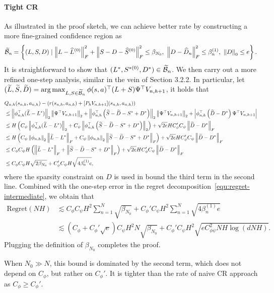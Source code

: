 \paragraph{Tight CR}
As illustrated in the proof sketch, we can achieve better rate by constructing a more fine-grained confidence region as 
\begin{align*}
\widetilde{{\cal B}}_n=\left\{(L,S,D) \mid \left\lVert L-\widehat L^{(0)}\right\rVert_F^2+\left\lVert S-D-\widehat S^{(0)}\right\rVert_F^2\le \beta_{N_0},\ \left\lVert D-\widehat D_n\right\rVert_F^2\le \beta_n^{(1)},\ \left\lVert D\right\rVert_0\le e\right\}.
\end{align*}
It is straightforward to show that $(L^*,S^{*(0)},D^*)\in \widetilde{{\cal B}}_n$.
We then carry out a more refined one-step analysis, similar in the vein of Section 3.2.2.
In particular, let $(\widetilde{ L},\widetilde{ S},\widetilde{D})=\arg\max_{\substack{ L, S \in \widetilde{{\cal B}}_n}}\phi(s, a)^{\top} ( L+ S)  \Psi^{\top} V_{n, h+1}$, it holds that
\begin{equation}
     \begin{aligned}
     &Q_{n,h}(s_{n,h},a_{n,h})-\left( r(s_{n,h},a_{n,h})+[P_h V_{n,h+1}](s_{n,h},a_{n,h}) \right) \\
     &\leq \left\lVert\phi_{n, h}^{\top}(\widetilde{ L} -  L^{*})\right\rVert_2\left\lVert \Psi^{\top} V_{n, h+1}\right\rVert_{2}+\left\lVert\phi_{n, h}^{\top}\left( \widetilde{ S}-\widetilde{D}-  S^*+D^* \right)\right\rVert_2\left\lVert \Psi^{\top} V_{n, h+1}\right\rVert_{2} +\left|\phi_{n, h}^{\top}\left( \widetilde{D}- D^* \right) \Psi^{\top} V_{n, h+1}\right| \\
     & \leq H\left( C_{\psi}\left\lVert\phi_{n, h}^{\top}(\widetilde{ L} -  L^*)\right\rVert_2+C_{\psi}\left\lVert\phi_{n, h}^{\top}\left( \widetilde{ S}-\widetilde{D}-  S^*+D^* \right)\right\rVert_2 \right)+\sqrt{2e}HC_{\phi}'C_{\psi}\left\lVert\widetilde{D}-D^*\right\rVert_F \\
     & \leq H\left( C_{\psi}\left\lVert\phi_{n, h}\right\rVert_2\left\lVert\widetilde{ L} -  L^{*}\right\rVert_F + C_{\psi}\left\lVert\phi_{n, h}\right\rVert_2\left\lVert\widetilde{ S}-\widetilde{D}-  S^*+D^*\right\rVert_F \right)+\sqrt{2e}HC_{\phi}'C_{\psi}\left\lVert\widetilde{D}-D^*\right\rVert_F \\
     & \leq C_{\phi}C_{\psi}H\left( \left\lVert\widetilde{ L}-  L^*\right\rVert_F + \left\lVert\widetilde{ S}-\widetilde{D}-  S^*+D^*\right\rVert_F \right)+\sqrt{2e}HC_{\phi}'C_{\psi}\left\lVert\widetilde{D}-D^*\right\rVert_F \\
     & \leq C_{\phi}C_{\psi}H\sqrt{2\beta_{N_0}}+C_{\phi}'C_{\psi}H\sqrt{4\beta_n^{(1)}e},
     \end{aligned}
    \end{equation}
where the sparsity constraint on $D$ is used in bound the third term in the second line.
Combined with the one-step error in the regret decomposition~\eqref{equ:regret-intermediate}, we obtain that
\begin{align*}
\text{Regret}
( N  H) &\lesssim C_{\phi}C_{\psi}H^2\sum_{n=1}^{ N }\sqrt{\beta_{N_0}}+C_{\phi}'C_{\psi}H^2\sum_{n=1}^{ N }\sqrt{4\beta_n^{(1)}e}\\&\lesssim 
\left(C_{\phi}+C_{\phi}'\sqrt{e}\right)C_{\psi}H^2 N \sqrt{\beta_{N_0}}+C_{\phi}'C_{\psi}H^2\sqrt{e C_{\phi\psi}^2 N H\log\left(dNH\right)}.
\end{align*}
Plugging the definition of $\beta_{N_0}$ completes the proof.

\begin{remark}
When $N_0\gg N$, this bound is dominated by the second term, which does not depend on $C_{\phi}$, but rather on $C_{\phi}'$. It is tighter than the rate of naive CR approach as $C_{\phi}\ge C_{\phi}'$.
\end{remark}